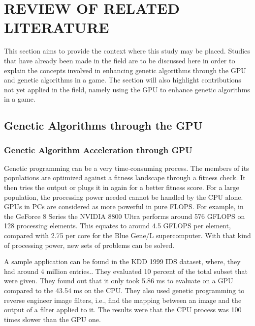 \chapter{REVIEW OF RELATED LITERATURE}

This section aims to provide the context where this study may be placed. 
Studies that have already been made in the field are to be discussed here in order to 
explain the concepts involved in enhancing genetic algorithms through the GPU and 
genetic algorithms in a game. The section will also highlight contributions not yet 
applied in the field, namely using the GPU to enhance genetic algorithms in a game.


\section{Genetic Algorithms through the GPU}
\subsection{Genetic Algorithm Acceleration through GPU}
Genetic programming can be a very time-consuming process.  The members of its
populations are optimized against a fitness landscape through a fitness check. It
then tries the output or plugs it in again for a better fitness score. For a large
population, the processing power needed cannot be handled by the CPU alone. GPUs in
PCs are considered as more powerful in pure FLOPS\cite{Banzhaf09}.
For example, in the GeForce 8 Series the NVIDIA 8800 Ultra performs around 576 GFLOPS
on 128 processing elements. This equates to around 4.5 GFLOPS per element, compared
with 2.75 per core for the Blue Gene/L supercomputer.  With that kind of processing power, 
new sets of problems can be solved.  

A sample application can be found in the KDD 1999 IDS dataset, where, they had around
4 million entries.\cite{Banzhaf09}. They evaluated 10 percent of the total subset that
were given. They found out that it only took 5.86 ms to evaluate on a GPU compared to
the 43.54 ms on the CPU. They also used genetic programming to reverse engineer image
filters, i.e., find the mapping between an image and the output of a filter applied to 
it. The results were that the CPU process was 100 times slower than the GPU one.  

